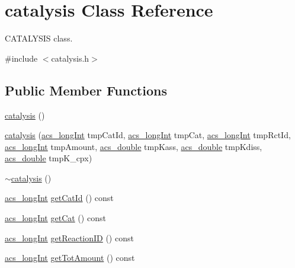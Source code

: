 \hypertarget{classcatalysis}{\section{catalysis Class Reference}
\label{classcatalysis}
}


C\-A\-T\-A\-L\-Y\-S\-I\-S class.  




{\ttfamily \#include $<$catalysis.\-h$>$}

\subsection*{Public Member Functions}
\begin{DoxyCompactItemize}
\item 
\hyperlink{classcatalysis_a7c4d1a67d2745293a17a6bee0df7c5cd}{catalysis} ()
\item 
\hyperlink{classcatalysis_ad512d0e2ff7cbb1b431c917f659a5395}{catalysis} (\hyperlink{acs__headers_8h_a19319d75f02db4308bc5c0026d98cd85}{acs\-\_\-long\-Int} tmp\-Cat\-Id, \hyperlink{acs__headers_8h_a19319d75f02db4308bc5c0026d98cd85}{acs\-\_\-long\-Int} tmp\-Cat, \hyperlink{acs__headers_8h_a19319d75f02db4308bc5c0026d98cd85}{acs\-\_\-long\-Int} tmp\-Rct\-Id, \hyperlink{acs__headers_8h_a19319d75f02db4308bc5c0026d98cd85}{acs\-\_\-long\-Int} tmp\-Amount, \hyperlink{acs__headers_8h_ab776853a005fcbf56af0424a2a4dd607}{acs\-\_\-double} tmp\-Kass, \hyperlink{acs__headers_8h_ab776853a005fcbf56af0424a2a4dd607}{acs\-\_\-double} tmp\-Kdiss, \hyperlink{acs__headers_8h_ab776853a005fcbf56af0424a2a4dd607}{acs\-\_\-double} tmp\-K\-\_\-cpx)
\item 
\hyperlink{classcatalysis_a982805165c59e95ac055dc24e684fa05}{$\sim$catalysis} ()
\item 
\hyperlink{acs__headers_8h_a19319d75f02db4308bc5c0026d98cd85}{acs\-\_\-long\-Int} \hyperlink{classcatalysis_a85ba5bd9c758392f245f1277141a1706}{get\-Cat\-Id} () const 
\item 
\hyperlink{acs__headers_8h_a19319d75f02db4308bc5c0026d98cd85}{acs\-\_\-long\-Int} \hyperlink{classcatalysis_a205e222dff1e80ff8f3195ab22e78726}{get\-Cat} () const 
\item 
\hyperlink{acs__headers_8h_a19319d75f02db4308bc5c0026d98cd85}{acs\-\_\-long\-Int} \hyperlink{classcatalysis_a6e0eea2f12109b36bb522ac971d1db29}{get\-Reaction\-I\-D} () const 
\item 
\hyperlink{acs__headers_8h_a19319d75f02db4308bc5c0026d98cd85}{acs\-\_\-long\-Int} \hyperlink{classcatalysis_a70a29d164efd7c22f56ba05da04f8c9b}{get\-Tot\-Amount} () const 

\end{DoxyCompactItemize}
